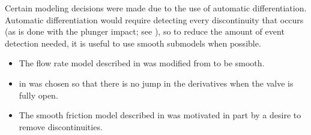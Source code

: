 Certain modeling decisions were made due to the use of automatic differentiation.
Automatic differentiation would require detecting every discontinuity that occurs (as is done with the plunger impact; see ), so to reduce the amount of event detection needed, it is useful to use smooth submodels when possible.
\begin{itemize}
\item The flow rate model described in  was modified from \citet[eq.~5.4, p.~46]{beater_pneumatic_2007} to be smooth.
\item {} in  was chosen so that there is no jump in the derivatives when the valve is fully open. %
\item The smooth friction model described in  was motivated in part by a desire to remove discontinuities.
\end{itemize}



